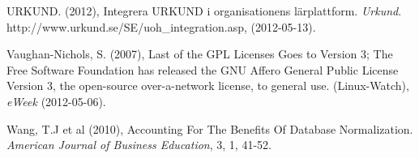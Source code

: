 \begin{flushleft}
URKUND. (2012), Integrera URKUND i organisationens lärplattform. \emph{Urkund}. http://www.urkund.se/SE/uoh\_integration.asp, (2012-05-13).

Vaughan-Nichols, S. (2007), Last of the GPL Licenses Goes to Version 3; The Free Software Foundation has released the GNU Affero General Public License Version 3, the open-source over-a-network license, to general use. (Linux-Watch), \emph{eWeek} (2012-05-06).

Wang, T.J et al (2010), Accounting For The Benefits Of Database Normalization. \emph{American Journal of Business Education}, 3, 1, 41-52.

\normalsize
\end{flushleft}
